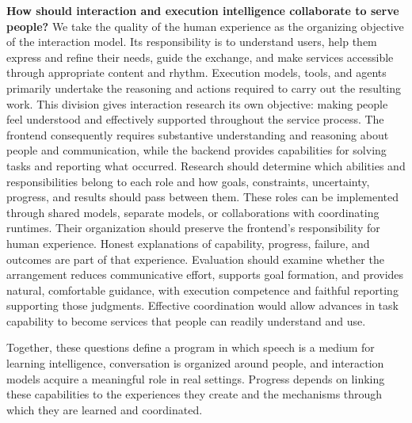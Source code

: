 \textbf{How should interaction and execution intelligence collaborate to serve people?} We take the quality of the human experience as the organizing objective of the interaction model. Its responsibility is to understand users, help them express and refine their needs, guide the exchange, and make services accessible through appropriate content and rhythm. Execution models, tools, and agents primarily undertake the reasoning and actions required to carry out the resulting work. This division gives interaction research its own objective: making people feel understood and effectively supported throughout the service process. The frontend consequently requires substantive understanding and reasoning about people and communication, while the backend provides capabilities for solving tasks and reporting what occurred. Research should determine which abilities and responsibilities belong to each role and how goals, constraints, uncertainty, progress, and results should pass between them. These roles can be implemented through shared models, separate models, or collaborations with coordinating runtimes. Their organization should preserve the frontend’s responsibility for human experience. Honest explanations of capability, progress, failure, and outcomes are part of that experience. Evaluation should examine whether the arrangement reduces communicative effort, supports goal formation, and provides natural, comfortable guidance, with execution competence and faithful reporting supporting those judgments. Effective coordination would allow advances in task capability to become services that people can readily understand and use.

Together, these questions define a program in which speech is a medium for learning intelligence, conversation is organized around people, and interaction models acquire a meaningful role in real settings. Progress depends on linking these capabilities to the experiences they create and the mechanisms through which they are learned and coordinated.



